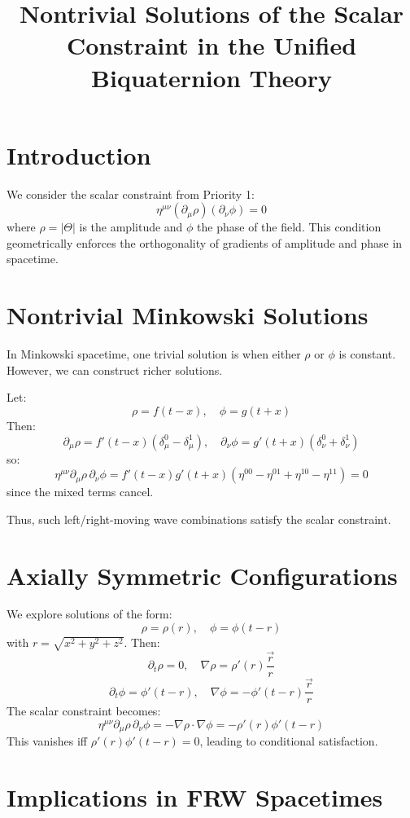 \documentclass{article}
\title{Nontrivial Solutions of the Scalar Constraint in the Unified Biquaternion Theory}
\author{}
\date{}
\begin{document}
\maketitle

\section{Introduction}

We consider the scalar constraint from Priority 1:
\[
\eta^{\mu\nu} (\partial_\mu \rho)(\partial_\nu \phi) = 0
\]
where \(\rho = |\Theta|\) is the amplitude and \(\phi\) the phase of the field. This condition geometrically enforces the orthogonality of gradients of amplitude and phase in spacetime.

\section{Nontrivial Minkowski Solutions}

In Minkowski spacetime, one trivial solution is when either \(\rho\) or \(\phi\) is constant. However, we can construct richer solutions.

Let:
\[
\rho = f(t - x), \quad \phi = g(t + x)
\]
Then:
\[
\partial_\mu \rho = f'(t - x)(\delta^0_\mu - \delta^1_\mu), \quad
\partial_\nu \phi = g'(t + x)(\delta^0_\nu + \delta^1_\nu)
\]
so:
\[
\eta^{\mu\nu} \partial_\mu \rho \, \partial_\nu \phi =
f'(t - x)g'(t + x) (\eta^{00} - \eta^{01} + \eta^{10} - \eta^{11}) = 0
\]
since the mixed terms cancel.

Thus, such left/right-moving wave combinations satisfy the scalar constraint.

\section{Axially Symmetric Configurations}

We explore solutions of the form:
\[
\rho = \rho(r), \quad \phi = \phi(t - r)
\]
with \(r = \sqrt{x^2 + y^2 + z^2}\). Then:
\[
\partial_t \rho = 0, \quad \nabla \rho = \rho'(r) \frac{\vec{r}}{r}
\]
\[
\partial_t \phi = \phi'(t - r), \quad \nabla \phi = -\phi'(t - r)\frac{\vec{r}}{r}
\]
The scalar constraint becomes:
\[
\eta^{\mu\nu} \partial_\mu \rho \, \partial_\nu \phi = -\nabla \rho \cdot \nabla \phi = -\rho'(r)\phi'(t - r)
\]
This vanishes iff \(\rho'(r)\phi'(t - r) = 0\), leading to conditional satisfaction.

\section{Implications in FRW Spacetimes}
\end{document}

